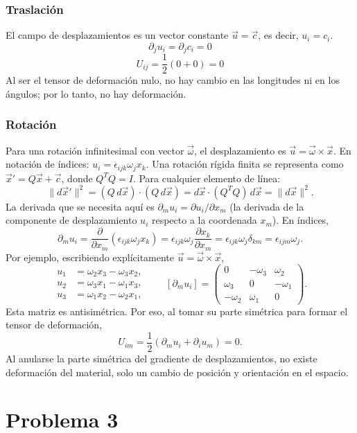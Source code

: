 \documentclass[a4paper]{article}
\begin{document}
\subsubsection*{Traslación}
El campo de desplazamientos es un vector constante $\vec{u} = \vec{c}$, es decir, $u_i = c_i$.
$$ \partial_j u_i = \partial_j c_i = 0 $$
$$ U_{ij} = \frac{1}{2}(0 + 0) = 0 $$
Al ser el tensor de deformación nulo, no hay cambio en las longitudes ni en los ángulos; por lo tanto, no hay deformación.

\subsubsection*{Rotación}
Para una rotación infinitesimal con vector $\vec{\omega}$, el desplazamiento es $\vec{u} = \vec{\omega} \times \vec{x}$. En notación de índices: $u_i = \epsilon_{ijk} \omega_j x_k$.
Una rotación rígida finita se representa como $\vec{x}'=Q\vec{x}+\vec{c}$, donde $Q^{T}Q=I$. Para cualquier elemento de línea:
$$
\lVert d\vec{x}'\rVert^2 = (Q\,d\vec{x})\cdot(Q\,d\vec{x}) = d\vec{x}\cdot(Q^TQ)\,d\vec{x} = \lVert d\vec{x}\rVert^2.
$$
La derivada que se necesita aquí es $\partial_m u_i=\partial u_i/\partial x_m$ (la derivada de la componente de desplazamiento $u_i$ respecto a la coordenada $x_m$). En índices,
$$
\partial_m u_i
=\frac{\partial}{\partial x_m}\left(\epsilon_{ijk}\omega_jx_k\right)
=\epsilon_{ijk}\omega_j\frac{\partial x_k}{\partial x_m}
=\epsilon_{ijk}\omega_j\delta_{km}
=\epsilon_{ijm}\omega_j.
$$
Por ejemplo, escribiendo explícitamente $\vec{u}=\vec{\omega}\times\vec{x}$,
$$
\begin{aligned}
u_1&=\omega_2x_3-\omega_3x_2,\\
u_2&=\omega_3x_1-\omega_1x_3,\\
u_3&=\omega_1x_2-\omega_2x_1,
\end{aligned}
\qquad
\left[\partial_m u_i\right]
=\begin{pmatrix}
0&-\omega_3&\omega_2\\
\omega_3&0&-\omega_1\\
-\omega_2&\omega_1&0
\end{pmatrix}.
$$
Esta matriz es antisimétrica. Por eso, al tomar su parte simétrica para formar el tensor de deformación,
$$
U_{im}=\frac12(\partial_m u_i+\partial_i u_m)=0.
$$
Al anularse la parte simétrica del gradiente de desplazamientos, no existe deformación del material, solo un cambio de posición y orientación en el espacio.

\section{Problema 3}
\end{document}
